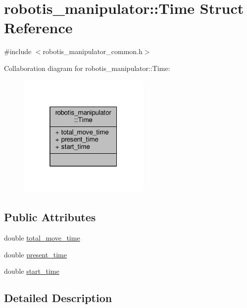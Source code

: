 \hypertarget{structrobotis__manipulator_1_1_time}{}\section{robotis\+\_\+manipulator\+:\+:Time Struct Reference}
\label{structrobotis__manipulator_1_1_time}


{\ttfamily \#include $<$robotis\+\_\+manipulator\+\_\+common.\+h$>$}



Collaboration diagram for robotis\+\_\+manipulator\+:\+:Time\+:\nopagebreak
\begin{figure}[H]
\begin{center}
\leavevmode
\includegraphics[width=181pt]{structrobotis__manipulator_1_1_time__coll__graph}
\end{center}
\end{figure}
\subsection*{Public Attributes}
\begin{DoxyCompactItemize}
\item 
double \hyperlink{structrobotis__manipulator_1_1_time_af1ee3f302af9a5fb1201124a89a9f4c0}{total\+\_\+move\+\_\+time}
\item 
double \hyperlink{structrobotis__manipulator_1_1_time_ad2cd4e29dff6c5491cc57abdfe1f8655}{present\+\_\+time}
\item 
double \hyperlink{structrobotis__manipulator_1_1_time_a9381eb504cea1e8405182cfc7e9abe13}{start\+\_\+time}
\end{DoxyCompactItemize}


\subsection{Detailed Description}


